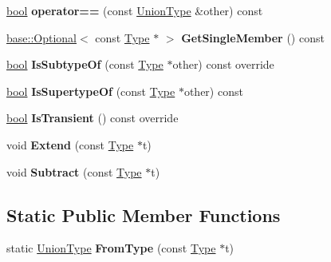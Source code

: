 \begin{DoxyCompactItemize}
\mbox{\hyperlink{classbool}{bool}} {\bfseries operator==} (const \mbox{\hyperlink{classv8_1_1internal_1_1torque_1_1UnionType}{Union\+Type}} \&other) const
\item 
\mbox{\label{classv8_1_1internal_1_1torque_1_1UnionType_a44c411671d3ff11cd66972b4ffdb28f1}} 
\mbox{\hyperlink{classv8_1_1base_1_1Optional}{base\+::\+Optional}}$<$ const \mbox{\hyperlink{classv8_1_1internal_1_1torque_1_1Type}{Type}} $\ast$ $>$ {\bfseries Get\+Single\+Member} () const
\item 
\mbox{\label{classv8_1_1internal_1_1torque_1_1UnionType_a594e3b5402071e4f6ebea4f140409865}} 
\mbox{\hyperlink{classbool}{bool}} {\bfseries Is\+Subtype\+Of} (const \mbox{\hyperlink{classv8_1_1internal_1_1torque_1_1Type}{Type}} $\ast$other) const override
\item 
\mbox{\label{classv8_1_1internal_1_1torque_1_1UnionType_a55633f67192b830450d03cfcde3cec15}} 
\mbox{\hyperlink{classbool}{bool}} {\bfseries Is\+Supertype\+Of} (const \mbox{\hyperlink{classv8_1_1internal_1_1torque_1_1Type}{Type}} $\ast$other) const
\item 
\mbox{\label{classv8_1_1internal_1_1torque_1_1UnionType_acaa8a5299925dd3a6cd2e1b150feea90}} 
\mbox{\hyperlink{classbool}{bool}} {\bfseries Is\+Transient} () const override
\item 
\mbox{\label{classv8_1_1internal_1_1torque_1_1UnionType_a0348e64c8df79e3a7be687603156dc8e}} 
void {\bfseries Extend} (const \mbox{\hyperlink{classv8_1_1internal_1_1torque_1_1Type}{Type}} $\ast$t)
\item 
\mbox{\label{classv8_1_1internal_1_1torque_1_1UnionType_ac194f4dfcbf67a502c7a6f8479fb68ed}} 
void {\bfseries Subtract} (const \mbox{\hyperlink{classv8_1_1internal_1_1torque_1_1Type}{Type}} $\ast$t)
\end{DoxyCompactItemize}
\subsection*{Static Public Member Functions}
\begin{DoxyCompactItemize}
\item 
\mbox{\label{classv8_1_1internal_1_1torque_1_1UnionType_a5aed571294cbab1a5b8e1c585b47e69c}} 
static \mbox{\hyperlink{classv8_1_1internal_1_1torque_1_1UnionType}{Union\+Type}} {\bfseries From\+Type} (const \mbox{\hyperlink{classv8_1_1internal_1_1torque_1_1Type}{Type}} $\ast$t)
\end{DoxyCompactItemize}
